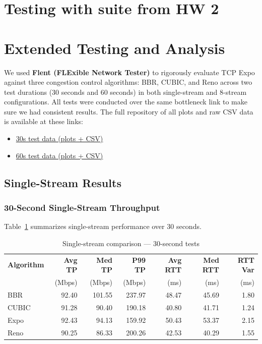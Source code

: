 \documentclass[11pt]{article}
\begin{document}
\newpage
\section{Testing with suite from HW 2}

\newpage
\section{Extended Testing and Analysis}

We used \textbf{Flent (FLExible Network Tester)} to rigorously evaluate TCP Expo against three congestion control algorithms: BBR, CUBIC, and Reno across two test durations (30 seconds and 60 seconds) in both single-stream and 8-stream configurations. All tests were conducted over the same bottleneck link to make sure we had consistent results. The full repository of all plots and raw CSV data is available at these links:
\begin{itemize}
    \item \href{https://github.com/CS536-Group2026/hw3/tree/main/plots30s}{30s test data (plots + CSV)}
    \item \href{https://github.com/CS536-Group2026/hw3/tree/main/plots60s}{60s test data (plots + CSV)}
\end{itemize}

\subsection{Single-Stream Results}

\subsubsection*{30-Second Single-Stream Throughput}

Table~\ref{tab:single30} summarizes single-stream performance over 30 seconds.

\begin{table}[H]
\centering
\caption{Single-stream comparison — 30-second tests}
\label{tab:single30}
\begin{tabular}{l r r r r r r}
\toprule
\textbf{Algorithm} & \textbf{Avg TP} & \textbf{Med TP} & \textbf{P99 TP} & \textbf{Avg RTT} & \textbf{Med RTT} & \textbf{RTT Var} \\
                    & (Mbps)          & (Mbps)          & (Mbps)          & (ms)             & (ms)             & (ms)             \\
\midrule
BBR   & 92.40  & 101.55 & 237.97 & 48.47 & 45.69 & 1.80 \\
CUBIC & 91.28  & 90.40  & 190.18 & 40.80 & 41.71 & 1.24 \\
\rowcolor{blue!8}
Expo  & 92.43  & 94.13  & 159.92 & 50.43 & 53.37 & 2.15 \\
Reno  & 90.25  & 86.33  & 200.26 & 42.53 & 40.29 & 1.55 \\
\bottomrule
\end{tabular}
\end{table}
\end{document}
